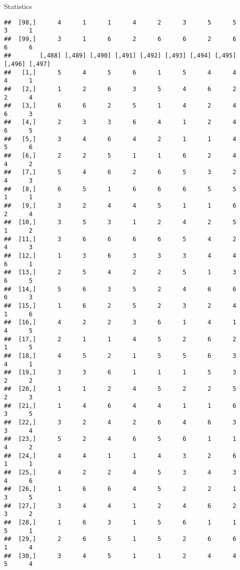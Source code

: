 \documentclass[
  ignorenonframetext,
]{beamer}
\begin{document}
\begin{frame}[fragile]{Statistics}
\begin{verbatim}
##  [98,]      4      1      1      4      2      3      5      5      3      1
##  [99,]      3      1      6      2      6      6      2      6      6      6
##        [,488] [,489] [,490] [,491] [,492] [,493] [,494] [,495] [,496] [,497]
##   [1,]      5      4      5      6      1      5      4      4      4      1
##   [2,]      1      2      6      3      5      4      6      2      2      4
##   [3,]      6      6      2      5      1      4      2      4      6      3
##   [4,]      2      3      3      6      4      1      2      4      6      5
##   [5,]      3      4      6      4      2      1      1      4      5      6
##   [6,]      2      2      5      1      1      6      2      4      4      2
##   [7,]      5      4      6      2      6      5      3      2      4      3
##   [8,]      6      5      1      6      6      6      5      5      1      1
##   [9,]      3      2      4      4      5      1      1      6      2      4
##  [10,]      3      5      3      1      2      4      2      5      1      2
##  [11,]      3      6      6      6      6      5      4      2      4      3
##  [12,]      1      3      6      3      3      3      4      4      6      1
##  [13,]      2      5      4      2      2      5      1      3      6      5
##  [14,]      5      6      3      5      2      4      6      6      6      3
##  [15,]      1      6      2      5      2      3      2      4      1      6
##  [16,]      4      2      2      3      6      1      4      1      4      5
##  [17,]      2      1      1      4      5      2      6      2      1      5
##  [18,]      4      5      2      1      5      5      6      3      4      1
##  [19,]      3      3      6      1      1      1      5      3      2      2
##  [20,]      1      1      2      4      5      2      2      5      2      3
##  [21,]      1      4      6      4      4      1      1      6      3      5
##  [22,]      3      2      4      2      6      4      6      3      3      4
##  [23,]      5      2      4      6      5      6      1      1      4      2
##  [24,]      4      4      1      1      4      3      2      6      1      1
##  [25,]      4      2      2      4      5      3      4      3      4      6
##  [26,]      1      6      6      4      5      2      2      1      3      5
##  [27,]      3      4      4      1      2      4      6      2      3      2
##  [28,]      1      6      3      1      5      6      1      1      5      1
##  [29,]      2      6      5      1      5      2      6      6      1      4
##  [30,]      3      4      5      1      1      2      4      4      5      4

\end{verbatim}
\end{frame}
\end{document}
